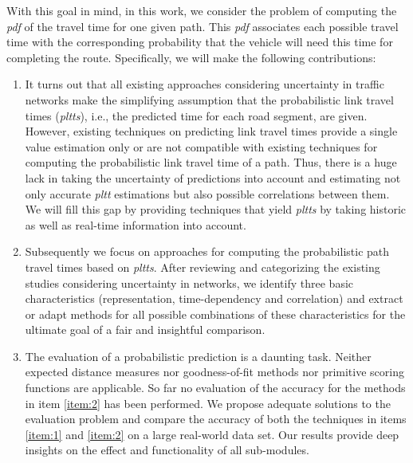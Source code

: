 With this goal in mind, in this work, we consider the problem of
computing the \textit{pdf} of the travel time for one given path. This
\textit{pdf} associates each possible travel time with the corresponding
probability that the vehicle will need this time for completing the route.
Specifically, we will make the following contributions:

\begin{enumerate}
  \item \label{item:1} It turns out that all existing approaches considering uncertainty in traffic
networks make the simplifying assumption that the probabilistic link travel
times (\textit{pltts}), i.e., the predicted time for each road segment, are
given. However, existing techniques on predicting link travel times provide a
single value estimation only or are not compatible with existing techniques for
computing the probabilistic link travel time of a path. Thus, there is a huge
lack in taking the uncertainty of predictions into account and estimating not
only accurate \textit{pltt} estimations but also possible correlations between them. We
will fill this gap by providing techniques that yield \textit{pltts} by taking historic
as well as real-time information into account.
  \item \label{item:2} Subsequently we focus on approaches for computing the
  probabilistic path travel times based on \textit{pltts}. After reviewing and categorizing the existing studies
 considering uncertainty in networks, we identify three basic characteristics
 (representation, time-dependency and correlation) and extract or adapt
 methods for all possible combinations of these characteristics for the ultimate
 goal of a fair and insightful comparison.
  \item The evaluation  of a probabilistic prediction is a daunting task.
  Neither expected distance measures nor goodness-of-fit methods nor primitive scoring
  functions are applicable. So far no evaluation of the accuracy for the
  methods in item \ref{item:2} has been performed. We propose adequate solutions to the evaluation problem and compare
  the accuracy of both the techniques in items \ref{item:1} and \ref{item:2} on
  a large real-world data set. Our results provide deep insights on the effect
  and functionality of all sub-modules.
\end{enumerate}

